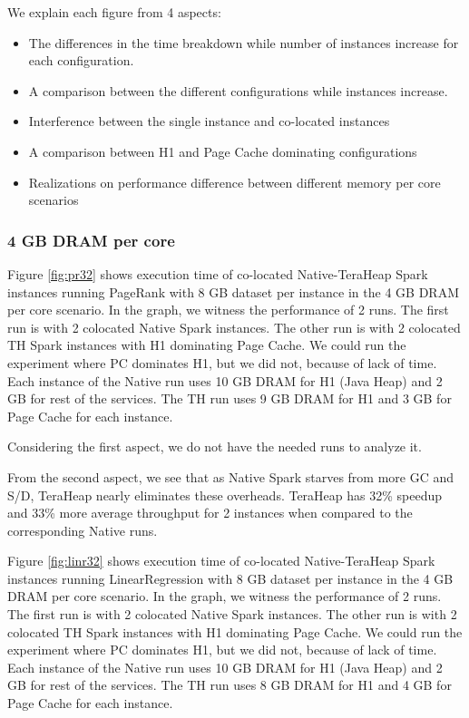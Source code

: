 We explain each figure from 4 aspects:
\begin{itemize}
\item{The differences in the time breakdown while number of instances increase for each configuration.}
\item{A comparison between the different configurations while instances increase.}
\item{Interference between the single instance and co-located instances}
\item{A comparison between H1 and Page Cache dominating configurations}
\item{Realizations on performance difference between different memory per core scenarios}
\end{itemize}


\subsubsection{4 GB DRAM per core}

Figure \ref{fig:pr32} shows execution time of co-located
Native-TeraHeap Spark instances running PageRank with 8 GB
dataset per instance in the 4 GB DRAM per core scenario.
In the graph, we witness the performance of 2 runs. The first run is with 2 colocated Native Spark instances.
The other run is with 2 colocated TH Spark instances with H1 dominating Page Cache.
We could run the experiment where PC dominates H1, but we did not, because of lack of time. 
Each instance of the Native run uses 10 GB DRAM for H1 (Java Heap) and 2 GB for rest of the services.
The TH run uses 9 GB DRAM for H1 and 3 GB for Page Cache for each instance.

Considering the first aspect, we do not have the needed runs to analyze it.

From the second aspect, we see that as Native Spark starves from more GC and S/D, TeraHeap nearly eliminates these overheads. TeraHeap has 32\% speedup and 33\% more average throughput for 2 instances when compared to the corresponding Native runs.

Figure \ref{fig:linr32} shows execution time of co-located
Native-TeraHeap Spark instances running LinearRegression with 8 GB
dataset per instance in the 4 GB DRAM per core scenario.
In the graph, we witness the performance of 2 runs. The first run is with 2 colocated Native Spark instances.
The other run is with 2 colocated TH Spark instances with H1 dominating Page Cache.
We could run the experiment where PC dominates H1, but we did not, because of lack of time.
Each instance of the Native run uses 10 GB DRAM for H1 (Java Heap) and 2 GB for rest of the services.
The TH run uses 8 GB DRAM for H1 and 4 GB for Page Cache for each instance.

